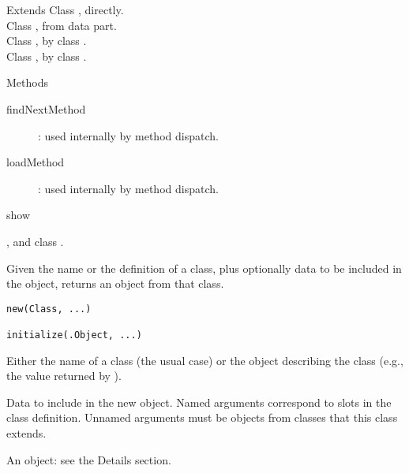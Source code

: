%
\begin{Section}{Extends}
Class , directly.\\{}
Class , from data part.\\{}
Class , by class .\\{}
Class , by class .
\end{Section}
%
\begin{Section}{Methods}
\begin{description}

\item[findNextMethod] :
used internally by method dispatch. 
\item[loadMethod] : used
internally by method dispatch. 
\item[show]  

\end{description}

\end{Section}
%
\begin{SeeAlso}\relax
  , and
class .
\end{SeeAlso}
%
\begin{Description}\relax
Given the name or the definition of a class, plus optionally data
to be included in the object,  returns an object from that
class.
\end{Description}
%
\begin{Usage}
\begin{verbatim}
new(Class, ...)

initialize(.Object, ...)
\end{verbatim}
\end{Usage}
%
\begin{Arguments}
\begin{ldescription}
\item[\code{Class}]  Either the name of a class (the usual case) or the
object describing the class (e.g., the value returned by
).
\item[\code{...}]  Data to include in the new object.  Named arguments
correspond to slots in the class definition. Unnamed arguments must
be objects from classes that this class extends.
\item[\code{.Object}]  An object:  see the Details section.
\end{ldescription}
\end{Arguments}
